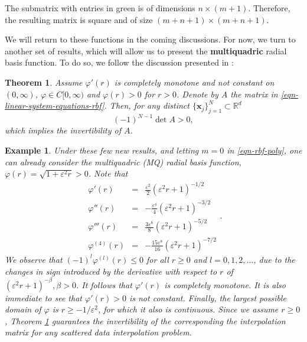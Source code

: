 \documentclass[12pt]{report} %
\newtheorem{theorem}{Theorem}
\newtheorem{example}{Example}
\newcommand{\tmmathbf}[1]{\ensuremath{\boldsymbol{#1}}}
\begin{document}
The submatrix with entries in green is of dimensions $n \times (m + 1)$. Therefore, the
resulting matrix is square and of size $(m + n + 1) \times (m + n + 1)$.

We will return to these functions in the coming discussions. For now, we turn to another set of results, which will allow us to present the \textbf{multiquadric} radial basis function. To do so, we follow the discussion presented in \cite{sarra2009multiquadric}:

\begin{theorem}
  Assume $\varphi'(r)$ is completely monotone and not constant on
  $(0, \infty)$, $\varphi \in C [0, \infty)$ and $\varphi (r) > 0$ for $r >
  0$. Denote by $A$ the matrix in \eqref{eqn-linear-system-equations-rbf}. Then,
  for any distinct $\{ \tmmathbf{x}_j \}_{j = 1}^N \subset \mathbb{R}^d$
  \[ (- 1)^{N - 1} \det A > 0, \]
  which implies the invertibility of $A$.
  \label{thm-A-invertible}
\end{theorem}

\begin{example}
Under these few new results, and letting $m = 0$ in \eqref{eqn-rbf-poly},
  one can already consider the multiquadric (MQ) radial basis function,
  $\varphi (r) = \sqrt{1 + \varepsilon^2 r} > 0$. Note that
  \[ \begin{array}{ccl}
       \varphi' (r) & = & \frac{\varepsilon^2}{2} (\varepsilon^2 r + 1)^{- 1 /
       2}\\
       \varphi'' (r) & = & - \frac{\varepsilon^4}{4} (\varepsilon^2 r + 1)^{-
       3 / 2}\\
       \varphi''' (r) & = & \frac{3 \varepsilon^6}{8} (\varepsilon^2 r + 1)^{-
       5 / 2}\\
       \varphi^{(4)} (r) & = & - \frac{15 \varepsilon^8}{16} (\varepsilon^2 r
       + 1)^{- 7 / 2}
     \end{array} . \]
  We observe that $(- 1)^l \varphi^{(l)} (r) \leq 0$ for all $r \geq 0$ and $l
  = 0, 1, 2, \ldots$, due to the changes in sign introduced by the derivative
  with respect to $r$ of $(\varepsilon^2 r + 1)^{- \beta}, \beta > 0$. It
  follows that $\varphi' (r)$ is completely monotone. It is also immediate to
  see that $\varphi' (r) > 0$ is not constant. Finally, the largest possible
  domain of $\varphi$ is $r \geq - 1 / \varepsilon^2$, for which it also is
  continuous. Since we assume $r \geq 0$, Theorem \ref{thm-A-invertible}
  guarantees the invertibility of the corresponding the interpolation matrix for
  any scattered data interpolation problem.
\end{example}
\end{document}

